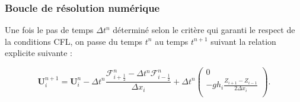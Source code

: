 \documentclass[
11pt, %
francais, %
singlespacing, %
headsepline, %
f%
]{MastersDoctoralThesis} %
\theoremstyle{definition}
\begin{document}
    \hypertarget{boucle-de-ruxe9solution-numuxe9rique}{%
\subsubsection*{Boucle de résolution
numérique}\label{boucle-de-ruxe9solution-numuxe9rique}}

Une fois le pas de temps \(\Delta t^n\) déterminé selon le critère qui
garanti le respect de la conditions CFL, on passe du temps \(t^n\) au
temps \(t^{n+1}\) suivant la relation explicite suivante :

\[\textbf{U}_i^{n+1}=\textbf{U}_i^{n}-\Delta t^n\frac{\mathcal{F}_{i+\frac{1}{2}}^n - \Delta t^n\mathcal{F}_{i-\frac{1}{2}}^n}{\Delta x_i}+\Delta t^n \begin{pmatrix}
0 \\
-gh_i \frac{Z_{i+1}-Z_{i-1}}{2\Delta x_i}\\
\end{pmatrix}.\]
\end{document}
